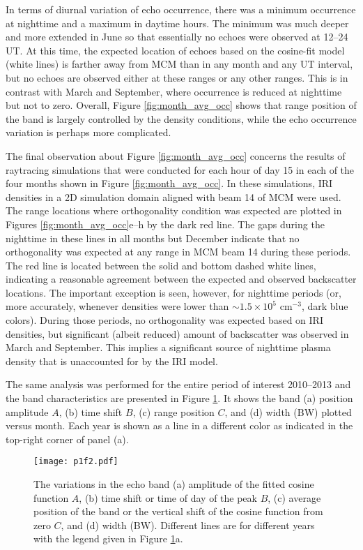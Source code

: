 In terms of diurnal variation of echo occurrence, there was a minimum occurrence at nighttime and a maximum in daytime hours. The minimum was much deeper and more extended in June so that essentially no echoes were observed at 12--24 UT. At this time, the expected location of echoes based on the cosine-fit model (white lines) is farther away from MCM than in any month and any UT interval, but no echoes are observed either at these ranges or any other ranges. This is in contrast with March and September, where occurrence is reduced at nighttime but not to zero. Overall, Figure \ref{fig:month_avg_occ} shows that range position of the band is largely controlled by the density conditions, while the echo occurrence variation is perhaps more complicated.

The final observation about Figure \ref{fig:month_avg_occ} concerns the results of raytracing simulations that were conducted for each hour of day 15 in each of the four months shown in Figure \ref{fig:month_avg_occ}. In these simulations, IRI densities in a 2D simulation domain aligned with beam 14 of MCM were used. The range locations where orthogonality condition was expected are plotted in Figures \ref{fig:month_avg_occ}e--h by the dark red line. The gaps during the nighttime in these lines in all months but December indicate that no orthogonality was expected at any range in MCM beam 14 during these periods. The red line is located between the solid and bottom dashed white lines, indicating a reasonable agreement between the expected and observed backscatter locations. The important exception is seen, however, for nighttime periods (or, more accurately, whenever densities were lower than \(\sim1.5\times10^5\) cm\(^{-3}\), dark blue colors). During those periods, no orthogonality was expected based on IRI densities, but significant (albeit reduced) amount of backscatter was observed in March and September. This implies a significant source of nighttime plasma density that is unaccounted for by the IRI model.



The same analysis was performed for the entire period of interest 2010--2013 and the band characteristics are presented in Figure \ref{fig:year_line}. It shows the band (a) position amplitude \(A\), (b) time shift \(B\), (c) range position \(C\), and (d) width (BW) plotted versus month.  Each year is shown as a line in a different color as indicated in the top-right corner of panel (a).

\begin{figure}
\texttt{[image: p1f2.pdf]}
\caption{The variations in the echo band (a) amplitude of the fitted cosine function \(A\), (b) time shift or time of day of the peak \(B\), (c) average position of the band or the vertical shift of the cosine function from zero \(C\), and (d) width (BW). Different lines are for different years with the legend given in Figure \ref{fig:year_line}a.}
\label{fig:year_line}
\end{figure}

